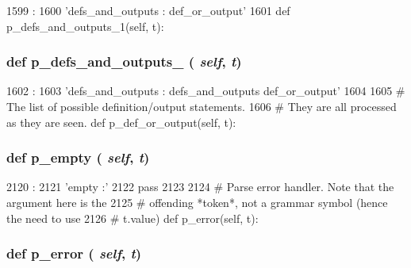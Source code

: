 \begin{DoxyCode}
1599                                      :
1600         'defs_and_outputs : def_or_output'
1601 
    def p_defs_and_outputs_1(self, t):
\end{DoxyCode}
\hypertarget{classisa__parser_1_1ISAParser_a8ce860f7017c611dff7546dfcb75eba9}{
\subsubsection[{p\_\-defs\_\-and\_\-outputs\_\-1}]{\setlength{\rightskip}{0pt plus 5cm}def p\_\-defs\_\-and\_\-outputs\_ ( {\em self}, \/   {\em t})}}
\label{classisa__parser_1_1ISAParser_a8ce860f7017c611dff7546dfcb75eba9}



\begin{DoxyCode}
1602                                      :
1603         'defs_and_outputs : defs_and_outputs def_or_output'
1604 
1605     # The list of possible definition/output statements.
1606     # They are all processed as they are seen.
    def p_def_or_output(self, t):
\end{DoxyCode}
\hypertarget{classisa__parser_1_1ISAParser_a7838c6749e452fa55c474e8b3f995a6c}{
\subsubsection[{p\_\-empty}]{\setlength{\rightskip}{0pt plus 5cm}def p\_\-empty ( {\em self}, \/   {\em t})}}
\label{classisa__parser_1_1ISAParser_a7838c6749e452fa55c474e8b3f995a6c}



\begin{DoxyCode}
2120                         :
2121         'empty :'
2122         pass
2123 
2124     # Parse error handler.  Note that the argument here is the
2125     # offending *token*, not a grammar symbol (hence the need to use
2126     # t.value)
    def p_error(self, t):
\end{DoxyCode}
\hypertarget{classisa__parser_1_1ISAParser_ae0bf47d4531770b27bea904d5ed183f6}{
\subsubsection[{p\_\-error}]{\setlength{\rightskip}{0pt plus 5cm}def p\_\-error ( {\em self}, \/   {\em t})}}
\label{classisa__parser_1_1ISAParser_ae0bf47d4531770b27bea904d5ed183f6}


